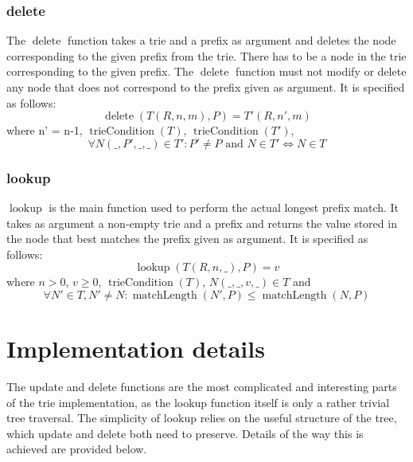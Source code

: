 \documentclass{article}
\DeclareMathOperator{\matchlength}{matchLength}
\DeclareMathOperator{\triecond}{trieCondition}
\DeclareMathOperator{\delete}{delete}
\DeclareMathOperator{\lookup}{lookup}
\begin{document}
\subsubsection{delete}
The $\delete$ function takes a trie and a prefix as argument and deletes the
node corresponding to the given prefix from the trie. There has to be a node in
the trie corresponding to the given prefix. The $\delete$ function must not
modify or delete any node that does not correspond to the prefix given as
argument. It is specified as follows:
\[
    \delete(T(R, n, m), P) = T'(R, n', m)
\]
where n' = n-1, $\triecond(T)$, $\triecond(T')$,
\[
    \forall N(\_, P', \_, \_) \in T': P' \neq P \text{ and }
    N \in T' \Leftrightarrow N \in T
\]
\subsubsection{lookup}
$\lookup$ is the main function used to perform the actual longest prefix match.
It takes as argument a non-empty trie and a prefix and returns the value stored
in the node that best matches the prefix given as argument. It is specified as
follows:
\[
    \lookup(T(R, n, \_), P) = v
\]
where $n > 0$, $v \geq 0$, $\triecond(T)$, $N(\_, \_, v, \_) \in T$ and
\[
    \forall N'\in T, N' \neq N: \matchlength(N', P) \leq \matchlength(N, P)
\]
\section{Implementation details}
The update and delete functions are the most complicated and interesting parts of
the trie implementation, as the lookup function itself is only a rather trivial
tree traversal. The simplicity of lookup relies on the useful structure of the
tree, which update and delete both need to preserve. Details of the way this is
achieved are provided below.
\end{document}
